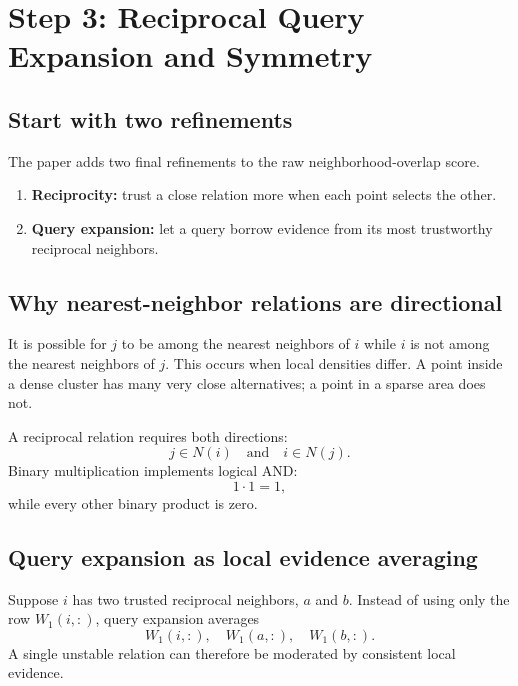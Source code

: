 \documentclass[11pt,oneside,openany]{book}
\theoremstyle{myplain}
\theoremstyle{definition}
\begin{document}
\chapter{Step 3: Reciprocal Query Expansion and Symmetry}
\label{chap:step3}

\section{Start with two refinements}

The paper adds two final refinements to the raw neighborhood-overlap score.

\begin{enumerate}[leftmargin=*,itemsep=5pt]
  \item \textbf{Reciprocity:} trust a close relation more when each point selects the other.
  \item \textbf{Query expansion:} let a query borrow evidence from its most trustworthy reciprocal neighbors.
\end{enumerate}

\section{Why nearest-neighbor relations are directional}

It is possible for $j$ to be among the nearest neighbors of $i$ while $i$ is not among the nearest neighbors of $j$. This occurs when local densities differ. A point inside a dense cluster has many very close alternatives; a point in a sparse area does not.

A reciprocal relation requires both directions:
\[
  j\in N(i)\quad\text{and}\quad i\in N(j).
\]
Binary multiplication implements logical AND:
\[
  1\cdot1=1,
\]
while every other binary product is zero.

\section{Query expansion as local evidence averaging}

Suppose $i$ has two trusted reciprocal neighbors, $a$ and $b$. Instead of using only the row $W_1(i,:)$, query expansion averages
\[
  W_1(i,:),\quad W_1(a,:),\quad W_1(b,:).
\]
A single unstable relation can therefore be moderated by consistent local evidence.
\end{document}
